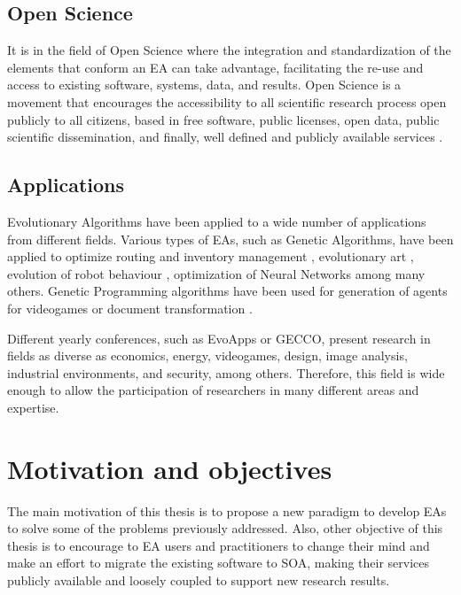\subsection{Open Science}
It is in the field of Open Science \cite{Altunay2011OpenScience} where the integration and standardization of
the elements that conform an EA can take advantage, facilitating the re-use and access to existing software, systems, data, and results. Open Science is a movement that encourages the accessibility to all scientific research process open publicly to all citizens, based in free software, public licenses, open data, public scientific dissemination, and finally, well defined and publicly available services \cite{Foster2005Science}.


\subsection{Applications}
Evolutionary Algorithms have been applied to a wide number of applications from different fields. Various types of EAs, such as Genetic Algorithms, have been applied to optimize routing and inventory management \cite{Esparcia2009EVITA}, evolutionary art \cite{Garcia2013RGB}, evolution of robot behaviour \cite{Garcia2012testing}, optimization of Neural Networks \cite{Castillo1999gprop} among many others. Genetic Programming algorithms have been used for generation of agents for videogames \cite{Esparcia2013GPunreal} or document transformation \cite{Garcia2008XSLT}. 

Different yearly conferences, such as EvoApps or GECCO, present research in fields as diverse as economics, energy, videogames, design, image analysis, industrial environments, and security, among others. Therefore, this field is wide enough to allow the participation of researchers in many different areas and expertise.







\section{Motivation and objectives}
\label{sec:intro:motivation}
The main motivation of this thesis is to propose a new paradigm to develop EAs to solve some of the problems previously addressed. Also, other objective of this thesis is to encourage to EA users and practitioners to change their mind and make an effort to migrate the existing software to SOA, making their services publicly available and loosely coupled to support new research results.

